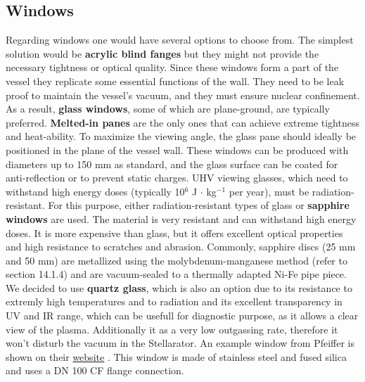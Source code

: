 \subsection{Windows}
Regarding windows one would have several options to choose from.
The simplest solution would be \textbf{acrylic blind fanges} but they might not provide the necessary tightness or optical quality.
Since these windows form a part of the vessel they replicate some essential functions of the wall.
They need to be leak proof to maintain the vessel's vacuum, and they must ensure nuclear confinement.
As a result, \textbf{glass windows}, some of which are plane-ground, are typically preferred.
\textbf{Melted-in panes} are the only ones that can achieve extreme tightness and heat-ability.
To maximize the viewing angle, the glass pane should ideally be positioned in the plane of the vessel wall.
These windows can be produced with diameters up to 150 mm as standard, and the glass surface can be coated for anti-reflection or to prevent static charges. UHV viewing glasses, which need to withstand high energy doses (typically 10$^6$ J $\cdot$ kg$^{-1}$ per year), must be radiation-resistant.
For this purpose, either radiation-resistant types of glass or \textbf{sapphire windows} are used.
The material is very resistant and can withstand high energy doses. It is more expensive than glass, but it offers excellent optical properties and high resistance to scratches and abrasion.
Commonly, sapphire discs (25 mm and 50 mm) are metallized using the molybdenum-manganese method (refer to section 14.1.4) and are vacuum-sealed to a thermally adapted Ni-Fe pipe piece.\cite{Wutz2000} We decided to use \textbf{quartz glass}, which is also an option due to its resistance to extremly high temperatures and to radiation and its excellent transparency in UV and IR range, which can be usefull for diagnostic purpose, as it allows a clear view of the plasma.
Additionally it as a very low outgassing rate, therefore it won't disturb the vacuum in the Stellarator.
An example window from Pfeiffer is shown on their \href{https://www.pfeiffer-vacuum.com/global/en/shop/products/420GSG100_SILICA_UV}{website} \cite{pfeiffer_window}.
This window is made of stainless steel and fused silica and uses a DN 100 CF flange connection.



